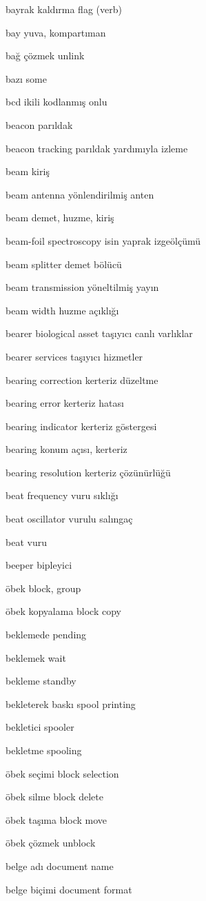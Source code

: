 \documentclass[12pt,fleqn]{article}\usepackage{../../common}
\begin{document}
bayrak kaldırma flag (verb)

bay yuva, kompartıman

bağ çözmek unlink

bazı some

bcd ikili kodlanmış onlu

beacon parıldak

beacon tracking parıldak yardımıyla izleme

beam kiriş

beam antenna yönlendirilmiş anten

beam demet, huzme, kiriş

beam-foil spectroscopy isin yaprak izgeölçümü

beam splitter demet bölücü

beam transmission yöneltilmiş yayın

beam width huzme açıklığı

bearer biological asset taşıyıcı canlı varlıklar

bearer services taşıyıcı hizmetler

bearing correction kerteriz düzeltme

bearing error kerteriz hatası

bearing indicator kerteriz göstergesi

bearing konum açısı, kerteriz

bearing resolution kerteriz çözünürlüğü

beat frequency vuru sıklığı

beat oscillator vurulu salıngaç

beat vuru

beeper bipleyici

öbek block, group

öbek kopyalama block copy

beklemede pending

beklemek wait

bekleme standby

bekleterek baskı spool printing

bekletici spooler

bekletme spooling

öbek seçimi block selection

öbek silme block delete

öbek taşıma block move

öbek çözmek unblock

belge adı document name

belge biçimi document format
\end{document}
